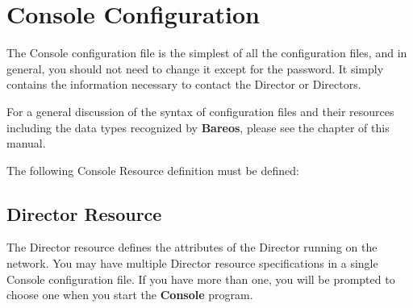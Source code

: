 
\chapter{Console Configuration}
\label{ConsoleConfChapter}

The Console configuration file is the simplest of all the configuration files,
and in general, you should not need to change it except for the password. It
simply contains the information necessary to contact the Director or
Directors.

For a general discussion of the syntax of configuration files and their
resources including the data types recognized by {\bf Bareos}, please see
the  chapter of this manual.

The following Console Resource definition must be defined:

\section{Director Resource}
\label{DirectorResource3}

The Director resource defines the attributes of the Director running on the
network. You may have multiple Director resource specifications in a single
Console configuration file. If you have more than one, you will be prompted to
choose one when you start the {\bf Console} program.

